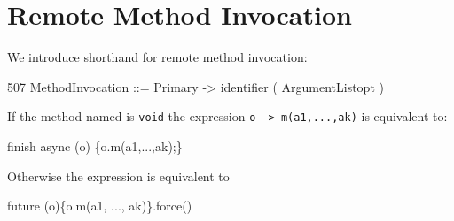 \section{Remote Method Invocation}
 We introduce shorthand for remote method invocation:
 
 \begin{x10}
 507   MethodInvocation ::= 
         Primary -> identifier ( ArgumentListopt )
 \end{x10}
 
 If the method named is {\tt void} the expression {\tt o -> m(a1,...,ak)}
 is equivalent to:
 \begin{x10}
  finish async (o) \{o.m(a1,...,ak);\}
 \end{x10}
 
 Otherwise the expression is equivalent to
 \begin{x10}
  future (o)\{o.m(a1, ..., ak)\}.force()
 \end{x10}

